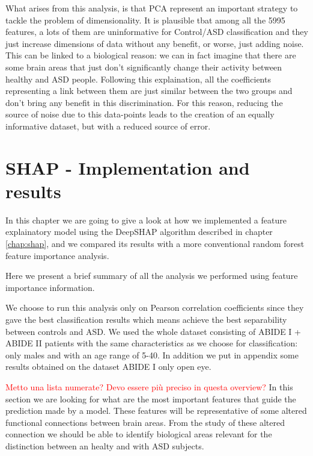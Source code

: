 \documentclass[11pt]{report}
\begin{document}
What arises from this analysis, is that PCA represent an important strategy to tackle the problem of dimensionality.
It is plausible tbat among all the 5995 features, a lots of them are uninformative for Control/ASD classification and they just increase dimensions of data without any benefit, or worse, just adding noise.
This can be linked to a biological reason: we can in fact imagine that there are some brain areas that just don't significantly change their activity between healthy and ASD people.
Following this explaination, all the coefficients representing a link between them are just similar between the two groups and don't bring any benefit in this discrimination.
For this reason, reducing the source of noise due to this data-points leads to the creation of an equally informative dataset, but with a reduced source of error.

\newpage


\chapter{SHAP - Implementation and results}\label{chap:shap_results}

In this chapter we are going to give a look at how we implemented a feature explainatory model using the DeepSHAP algorithm described in chapter \ref{chap:shap}, and we compared its results with a more conventional random forest feature importance analysis.

Here we present a brief summary of all the analysis we performed using feature importance information.

We choose to run this analysis only on Pearson correlation coefficients since they gave the best classification results which means achieve the best separability between controls and ASD.
We used the whole dataset consisting of ABIDE I + ABIDE II patients with the same characteristics as we choose for classification: only males and with an age range of 5-40.
In addition we put in appendix some results obtained on the dataset ABIDE I only open eye.

\textcolor{red}{Metto una lista numerate? Devo essere più preciso in questa overview?}
In this section we are looking for what are the most important features that guide the prediction made by a model.
These features will be representative of some altered functional connections between brain areas.
From the study of these altered connection we should be able to identify biological areas relevant for the distinction between an healty and with ASD subjects.
\end{document}
